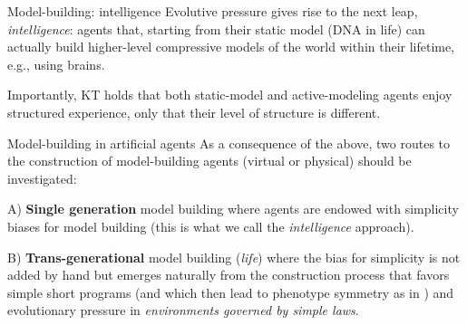 \begin{frame}[label=ladila]{Model-building: intelligence}
 Evolutive pressure gives rise to the next leap, {\em intelligence}: agents that, starting from their static model (DNA in life) can actually build higher-level compressive models of the world within their lifetime, e.g., using brains.\vfill
 
 Importantly, KT holds that both static-model and active-modeling agents enjoy structured experience, only that their level of structure is different. 
\end{frame}


\begin{frame}[label=ladila]{Model-building in artificial agents}
As a consequence of the above, two routes to the construction of model-building agents   (virtual or physical)  should be investigated: \vfill

A) {\bf Single generation} model building where agents are endowed with simplicity biases for model building (this is what we call the  {\em intelligence} approach). \vfill


B) {\bf Trans-generational} model building ({\em life}) where the bias for simplicity is not added by hand but emerges naturally from the construction process that favors simple short programs (and which then lead to phenotype symmetry as in \citep{Johnston2022})  and evolutionary pressure in {\em  environments governed by simple laws}.  
\end{frame}